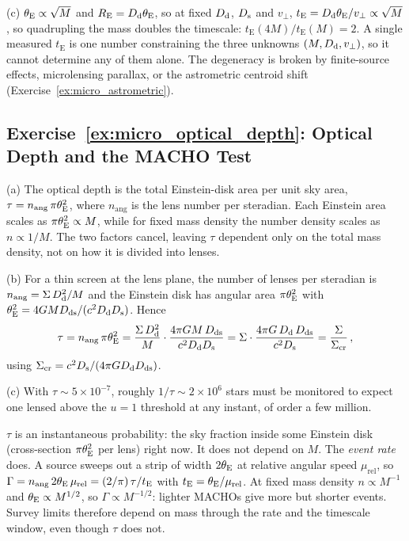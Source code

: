 (c) $\theta_{\mathrm{E}} \propto \sqrt{M}$ and $R_{\mathrm{E}} = D_{\mathrm{d}}\theta_{\mathrm{E}}$, so
at fixed $D_{\mathrm{d}}$, $D_{\mathrm{s}}$ and $v_\perp$, $t_{\mathrm{E}} = D_{\mathrm{d}}\theta_{\mathrm{E}}/v_\perp
\propto \sqrt{M}$, so quadrupling the mass doubles the timescale:
$t_{\mathrm{E}}(4M)/t_{\mathrm{E}}(M) = 2$.
A single measured $t_{\mathrm{E}}$ is one number constraining the three
unknowns $(M, D_{\mathrm{d}}, v_\perp)$, so it cannot determine any of them alone.  The
degeneracy is broken by finite-source effects, microlensing parallax, or the
astrometric centroid shift (Exercise~\ref{ex:micro_astrometric}). \checkmark


\subsection*{Exercise~\ref{ex:micro_optical_depth}: Optical Depth and the MACHO Test}

(a) The optical depth is the total Einstein-disk area per unit sky
area, $\tau = n_{\mathrm{ang}}\,\pi\theta_{\mathrm{E}}^2$, where $n_{\mathrm{ang}}$ is the
lens number per steradian.  Each Einstein area scales as
$\pi\theta_{\mathrm{E}}^2 \propto M$, while for fixed mass density the number density
scales as $n \propto 1/M$.  The two factors cancel, leaving $\tau$ dependent
only on the total mass density, not on how it is divided into lenses. \checkmark

(b) For a thin screen at the lens plane, the number of lenses per
steradian is $n_{\mathrm{ang}} = \Sigma\,D_{\mathrm{d}}^2/M$ and the Einstein disk has
angular area $\pi\theta_{\mathrm{E}}^2$ with $\theta_{\mathrm{E}}^2 = 4G MD_{\mathrm{ds}}/
(c^2D_{\mathrm{d}}D_{\mathrm{s}})$.  Hence
\begin{equation*}
    \tau = n_{\mathrm{ang}}\,\pi\theta_{\mathrm{E}}^2
    = \frac{\Sigma\,D_{\mathrm{d}}^2}{M}\cdot
    \frac{4\pi G M\,D_{\mathrm{ds}}}{c^2D_{\mathrm{d}}D_{\mathrm{s}}}
    = \Sigma\cdot\frac{4\pi G\,D_{\mathrm{d}}\,D_{\mathrm{ds}}}{c^2D_{\mathrm{s}}}
    = \frac{\Sigma}{\Sigma_{\mathrm{cr}}} \,,
\end{equation*}
using $\Sigma_{\mathrm{cr}} = c^2D_{\mathrm{s}}/(4\pi GD_{\mathrm{d}}D_{\mathrm{ds}})$. \checkmark

(c) With $\tau \sim 5\times10^{-7}$, roughly $1/\tau \sim 2\times10^6$
stars must be monitored to expect one lensed above the $u=1$ threshold at any
instant, of order a few million. \checkmark

\begin{annotation}
$\tau$ is an instantaneous probability: the sky fraction inside some
Einstein disk (cross-section $\pi\theta_{\mathrm{E}}^2$ per lens) right now.  It does not
depend on $M$.  The \emph{event rate} does.  A source sweeps out a strip of
width $2\theta_{\mathrm{E}}$ at relative angular speed $\mu_{\mathrm{rel}}$, so
$\Gamma = n_{\mathrm{ang}}\,2\theta_{\mathrm{E}}\,\mu_{\mathrm{rel}}
= (2/\pi)\,\tau/t_{\mathrm E}$ with $t_{\mathrm E} = \theta_{\mathrm{E}}/\mu_{\mathrm{rel}}$.
At fixed mass density $n \propto M^{-1}$ and $\theta_{\mathrm{E}} \propto M^{1/2}$, so
$\Gamma \propto M^{-1/2}$: lighter MACHOs give more but shorter events.
Survey limits therefore depend on mass through the rate and the timescale
window, even though $\tau$ does not.
\end{annotation}

